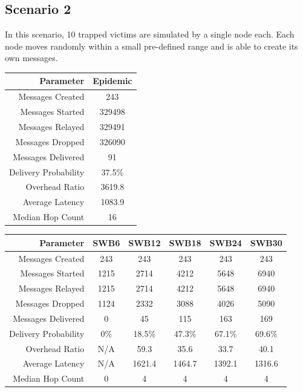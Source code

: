 \documentclass{article}
\begin{document}
\restoregeometry

\clearpage

\subsection{Scenario 2}
In this scenario, 10 trapped victims are simulated by a single node each. Each node moves randomly within a small pre-defined range and is able to create its own messages.

\begin{center}
\vspace{6px}
\begin{tabular}{|r|c|}
\hline
\textbf{Parameter} & \textbf{Epidemic} \\ \hline
Messages Created & 243 \\ \hline
Messages Started & 329498 \\ \hline
Messages Relayed & 329491 \\ \hline
Messages Dropped & 326090 \\ \hline
Messages Delivered & 91 \\ \hline
Delivery Probability & 37.5\%\\ \hline
Overhead Ratio & 3619.8 \\ \hline
Average Latency & 1083.9 \\ \hline
Median Hop Count & 16 \\ \hline
\end{tabular}
\end{center}

\begin{center}
\vspace{6px}
\begin{tabular}{|r|c|c|c|c|c|}
\hline
\textbf{Parameter} & \textbf{SWB6} & \textbf{SWB12} & \textbf{SWB18} & \textbf{SWB24} & \textbf{SWB30} \\ \hline
Messages Created & 243 & 243 & 243 & 243 & 243 \\ \hline
Messages Started & 1215 & 2714 & 4212 & 5648 & 6940 \\ \hline
Messages Relayed & 1215 & 2714 & 4212 & 5648 & 6940 \\ \hline
Messages Dropped & 1124 & 2332 & 3088 & 4026 & 5090 \\ \hline
Messages Delivered & 0 & 45 & 115 & 163 & 169 \\ \hline
Delivery Probability & 0\% & 18.5\% & 47.3\% & 67.1\% & 69.6\% \\ \hline
Overhead Ratio & N/A & 59.3 & 35.6 & 33.7 & 40.1 \\ \hline
Average Latency & N/A & 1621.4 & 1464.7 & 1392.1 & 1316.6 \\ \hline
Median Hop Count & 0 & 4 & 4 & 4 & 4 \\ \hline
\end{tabular}
\end{center}
\end{document}
